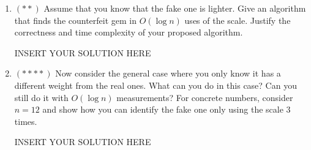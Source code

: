 \begin{enumerate}
    \item $(**)$ Assume that you know that the fake one is lighter. Give an algorithm that finds the counterfeit gem in $O(\log n)$ uses of the scale. Justify the correctness and time complexity of your proposed algorithm.

\begin{solution}   INSERT YOUR SOLUTION HERE   \end{solution}

    \item $(****)$ Now consider the general case where you only know it has a different weight from the real ones. What can you do in this case? Can you still do it with $O(\log n)$ measurements? For concrete numbers, consider $n=12$ and show how you can identify the fake one only using the scale $3$ times.

\begin{solution}   INSERT YOUR SOLUTION HERE   \end{solution}
\end{enumerate}

